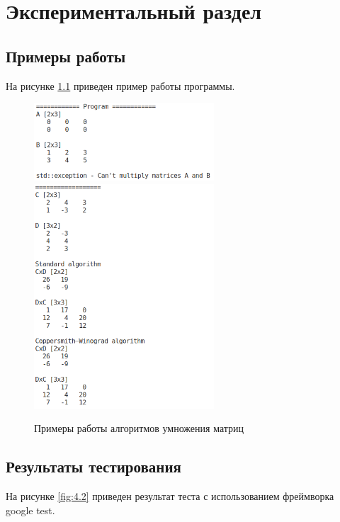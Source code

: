\chapter{Экспериментальный раздел}
\label{cha:research}

\section{Примеры работы}
На рисунке \ref{fig:4.1} приведен пример работы программы.

\begin{figure}[h]
    \centering
    \includegraphics[width=0.6\textwidth]{2/inc/e1.png}
    \includegraphics[width=0.6\textwidth]{2/inc/e2.png}
    \caption{Примеры работы алгоритмов умножения матриц}
    \label{fig:4.1}
\end{figure}


\pagebreak
\section{Результаты тестирования}

На рисунке \ref{fig:4.2} приведен результат теста с использованием фреймворка google test.

